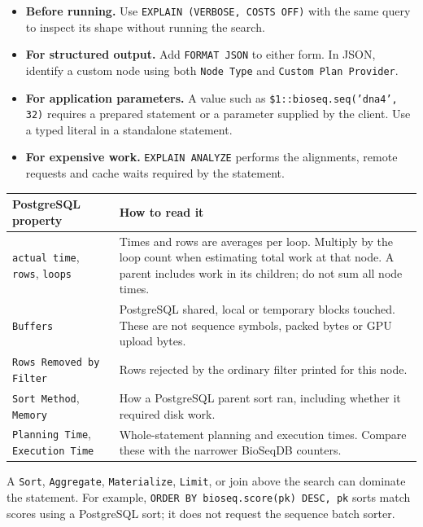 \begin{itemize}
  \item \textbf{Before running.} Use \texttt{EXPLAIN (VERBOSE, COSTS OFF)}
    with the same query to inspect its shape without running the search.
  \item \textbf{For structured output.} Add \texttt{FORMAT JSON} to either
    form. In JSON, identify a custom node using both \texttt{Node Type} and
    \texttt{Custom Plan Provider}.
  \item \textbf{For application parameters.} A value such as
    \texttt{\$1::bioseq.seq('dna4', 32)} requires a prepared statement or a
    parameter supplied by the client. Use a typed literal in a standalone
    statement.
  \item \textbf{For expensive work.} \texttt{EXPLAIN ANALYZE} performs the
    alignments, remote requests and cache waits required by the statement.
\end{itemize}

\begingroup\small
\begin{longtable}{@{}p{.35\linewidth}p{.60\linewidth}@{}}
\toprule
\textbf{PostgreSQL property} & \textbf{How to read it}\\
\midrule\endhead
\texttt{actual time}, \texttt{rows}, \texttt{loops} &
Times and rows are averages per loop. Multiply by the loop count when
estimating total work at that node. A parent includes work in its children;
do not sum all node times.\\
\texttt{Buffers} & PostgreSQL shared, local or temporary blocks touched.
These are not sequence symbols, packed bytes or GPU upload bytes.\\
\texttt{Rows Removed by Filter} & Rows rejected by the ordinary filter
printed for this node.\\
\texttt{Sort Method}, \texttt{Memory} & How a PostgreSQL parent sort ran,
including whether it required disk work.\\
\texttt{Planning Time}, \texttt{Execution Time} & Whole-statement planning
and execution times. Compare these with the narrower BioSeqDB counters.\\
\bottomrule
\end{longtable}
\endgroup

A \texttt{Sort}, \texttt{Aggregate}, \texttt{Materialize}, \texttt{Limit}, or
join above the search can dominate the statement. For example,
\texttt{ORDER BY bioseq.score(pk) DESC, pk} sorts match scores using a
PostgreSQL sort; it does not request the sequence batch sorter.

